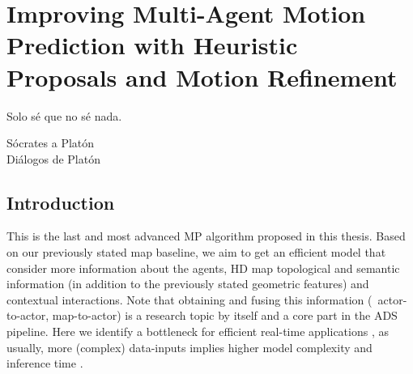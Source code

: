 % 
% 
% 
% 
% 
% 
% 

\chapter{Improving Multi-Agent Motion Prediction with Heuristic Proposals and Motion Refinement}
\label{cha:improving_multi_agent}

\begin{FraseCelebre}
	\begin{Frase}
		Solo sé que no sé nada.
	\end{Frase}
	\begin{Fuente}
		Sócrates a Platón \\
		Diálogos de Platón
	\end{Fuente}
\end{FraseCelebre}

\section{Introduction}
\label{sec:7_introduction}

This is the last and most advanced \ac{MP} algorithm proposed in this thesis. Based on our previously stated map baseline, we aim to get an efficient model that consider more information about the agents, HD map topological and semantic information (in addition to the previously stated geometric features) and contextual interactions. Note that obtaining and fusing this information (\eg \ actor-to-actor, map-to-actor) is a research topic by itself \cite{varadarajan2022multipath++, zeng2021lanercnn, liang2020learning} and a core part in the \ac{ADS} pipeline. Here we identify a bottleneck for efficient real-time applications \cite{KATRAKAZAS2015416realtime, gomez2021smartmot}, as usually, more (complex) data-inputs implies higher model complexity and inference time \cite{gao2020vectornet}. 

